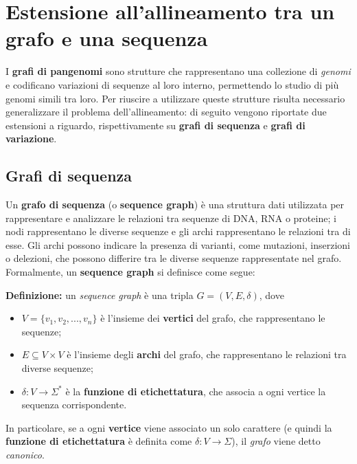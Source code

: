 \raggedright
\section{Estensione all'allineamento tra un grafo e una sequenza}
    I \textbf{grafi di pangenomi} sono strutture che rappresentano una collezione di \emph{genomi} e codificano variazioni di sequenze al loro interno, permettendo lo studio di più genomi simili tra loro. Per riuscire a utilizzare queste strutture risulta necessario generalizzare il problema dell'allineamento: di seguito vengono riportate due estensioni a riguardo, rispettivamente su \textbf{grafi di sequenza} e \textbf{grafi di variazione}.
    
\subsection{Grafi di sequenza}
    Un \textbf{grafo di sequenza} (o \textbf{sequence graph}) è una struttura dati utilizzata per rappresentare e analizzare le relazioni tra sequenze di DNA, RNA o proteine; i nodi rappresentano le diverse sequenze e gli archi rappresentano le relazioni tra di esse. Gli archi possono indicare la presenza di varianti, come mutazioni, inserzioni o delezioni, che possono differire tra le diverse sequenze rappresentate nel grafo. Formalmente, un \textbf{sequence graph} si definisce come segue:
    
    \vspace{20pt}
    \textbf{Definizione:} un \emph{sequence graph} è una tripla $G = (V, E, \delta)$, dove
    \begin{itemize}
        \item $V = \{v_1, v_2, ..., v_n\}$ è l'insieme dei \textbf{vertici} del grafo, che rappresentano le sequenze;
        \item  $E \subseteq V \times V$ è l'insieme degli \textbf{archi} del grafo, che rappresentano le relazioni tra diverse sequenze;
        \item $\delta: V \rightarrow \Sigma^*$ è la \textbf{funzione di etichettatura}, che associa a ogni vertice la sequenza corrispondente.
    \end{itemize}
    In particolare, se a ogni \textbf{vertice} viene associato un solo carattere (e quindi la \textbf{funzione di etichettatura} è definita come $\delta: V \rightarrow \Sigma$), il \emph{grafo} viene detto \emph{canonico}. 

